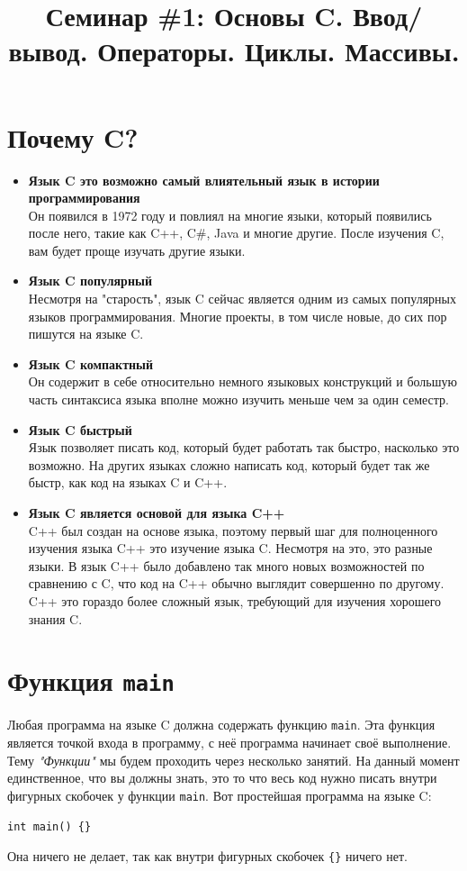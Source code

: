 \documentclass{article}
\begin{document}
\title{Семинар \#1: Основы C. Ввод/вывод. Операторы. Циклы. Массивы. \vspace{-5ex}}\date{}\maketitle
\section*{Почему C?}
\begin{itemize}
\item \textbf{Язык C это возможно самый влиятельный язык в истории программирования}\\
Он появился в 1972 году и повлиял на многие языки, который появились после него, такие как C++, C\#, Java и многие другие. После изучения C, вам будет проще изучать другие языки.

\item \textbf{Язык C популярный}\\
Несмотря на "старость", язык C сейчас является одним из самых популярных языков программирования.
Многие проекты, в том числе новые, до сих пор пишутся на языке C.

\item \textbf{Язык C компактный}\\
Он содержит в себе относительно немного языковых конструкций и большую часть синтаксиса языка вполне можно 
изучить меньше чем за один семестр.

\item \textbf{Язык C быстрый}\\
Язык позволяет писать код, который будет работать так быстро, насколько это возможно.
На других языках сложно написать код, который будет так же быстр, как код на языках C и C++.


\item \textbf{Язык C является основой для языка C++}\\
C++ был создан на основе языка, поэтому первый шаг для полноценного изучения языка C++ это изучение языка C.
Несмотря на это, это разные языки. В язык C++ было добавлено так много новых возможностей по сравнению с C,
что код на C++ обычно выглядит совершенно по другому.
C++ это гораздо более сложный язык, требующий для изучения хорошего знания C.
\end{itemize}


\section*{Функция \texttt{main}}
\indent Любая программа на языке C должна содержать функцию \texttt{main}.
Эта функция является точкой входа в программу, с неё программа начинает своё выполнение.
Тему \textit{"Функции"} мы будем проходить через несколько занятий.
На данный момент единственное, что вы должны знать, это то что весь код нужно писать внутри фигурных скобочек \texttt{{}} у функции \texttt{main}.
Вот простейшая программа на языке C: 
\begin{lstlisting}
int main() {}
\end{lstlisting}
Она ничего не делает, так как внутри фигурных скобочек \texttt{\{\}} ничего нет.
\end{document}
